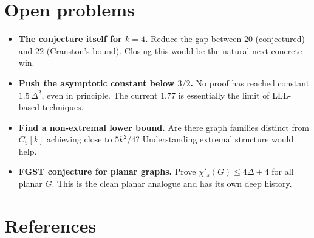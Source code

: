 \documentclass[11pt]{article}
\newcommand{\sci}{\chi'_s}
\begin{document}
\section*{Open problems}

\begin{itemize}[leftmargin=*, itemsep=2pt]
  \item \textbf{The conjecture itself for $k = 4$.} Reduce the gap
        between $20$ (conjectured) and $22$ (Cranston's bound).
        Closing this would be the natural next concrete win.
  \item \textbf{Push the asymptotic constant below $3/2$.} No proof
        has reached constant $1.5\,\Delta^2$, even in principle.
        The current $1.77$ is essentially the limit of LLL-based
        techniques.
  \item \textbf{Find a non-extremal lower bound.} Are there graph
        families distinct from $C_5[k]$ achieving close to $5k^2/4$?
        Understanding extremal structure would help.
  \item \textbf{FGST conjecture for planar graphs.} Prove
        $\sci(G) \leq 4\Delta + 4$ for all planar $G$. This is the
        clean planar analogue and has its own deep history.
\end{itemize}

\section*{References}
\end{document}
